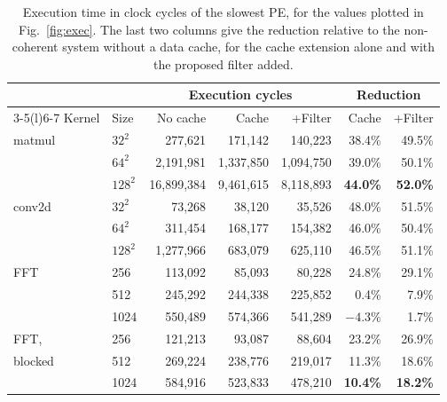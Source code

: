 \begin{table}[t]
\caption{Execution time in clock cycles of the slowest PE, for the values
plotted in Fig.~\ref{fig:exec}. The last two columns give the reduction
relative to the non-coherent system without a data cache, for the cache
extension alone and with the proposed filter added.}
\label{tab:exec}
\centering
\scriptsize
\setlength{\tabcolsep}{4pt}
\begin{tabular}{@{}llrrrrr@{}}
\toprule
& & \multicolumn{3}{c}{Execution cycles} & \multicolumn{2}{c}{Reduction} \\
\cmidrule(lr){3-5}\cmidrule(l){6-7}
Kernel & Size & No cache & Cache & +Filter & Cache & +Filter \\
\midrule
matmul & $32^2$  &    277{,}621 &   171{,}142 &   140{,}223 & 38.4\% & 49.5\% \\
       & $64^2$  &  2{,}191{,}981 & 1{,}337{,}850 & 1{,}094{,}750 & 39.0\% & 50.1\% \\
       & $128^2$ & 16{,}899{,}384 & 9{,}461{,}615 & 8{,}118{,}893 & \textbf{44.0\%} & \textbf{52.0\%} \\
\addlinespace
conv2d & $32^2$  &     73{,}268 &    38{,}120 &    35{,}526 & 48.0\% & 51.5\% \\
       & $64^2$  &    311{,}454 &   168{,}177 &   154{,}382 & 46.0\% & 50.4\% \\
       & $128^2$ &  1{,}277{,}966 &   683{,}079 &   625{,}110 & 46.5\% & 51.1\% \\
\addlinespace
FFT    & 256     &    113{,}092 &    85{,}093 &    80{,}228 & 24.8\% & 29.1\% \\
       & 512     &    245{,}292 &   244{,}338 &   225{,}852 &  0.4\% &  7.9\% \\
       & 1024    &    550{,}489 &   574{,}366 &   541{,}289 & $-4.3\%$ &  1.7\% \\
\addlinespace
FFT,   & 256     &    121{,}213 &    93{,}087 &    88{,}604 & 23.2\% & 26.9\% \\
blocked & 512    &    269{,}224 &   238{,}776 &   219{,}017 & 11.3\% & 18.6\% \\
       & 1024    &    584{,}916 &   523{,}833 &   478{,}210 & \textbf{10.4\%} & \textbf{18.2\%} \\
\bottomrule
\end{tabular}
\end{table}
